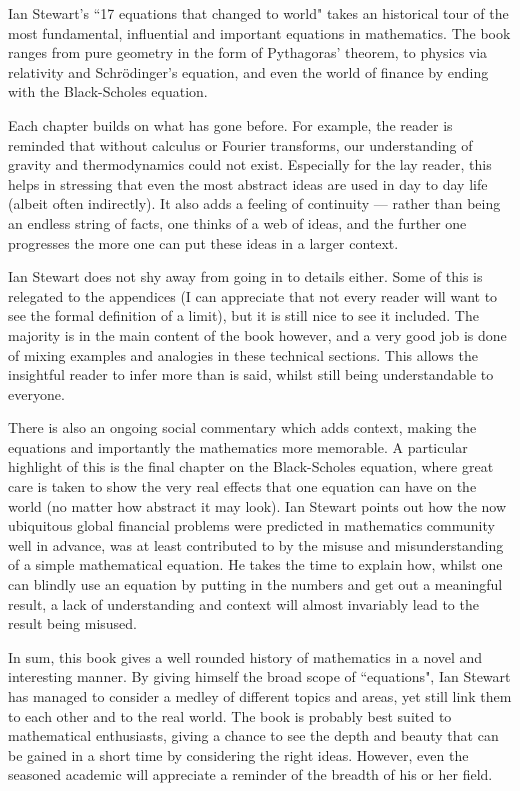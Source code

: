 \documentclass[article,11pt]{memoir}
\begin{document}
Ian Stewart's ``17 equations that changed to world" takes an historical tour of the most fundamental, influential and important equations in mathematics. The book ranges from pure geometry in the form of Pythagoras' theorem, to physics via relativity and Schr\"odinger's equation, and even the world of finance by ending with the Black-Scholes equation.

Each chapter builds on what has gone before. For example, the reader is reminded that without calculus or Fourier transforms, our understanding of gravity and thermodynamics could not exist. Especially for the lay reader, this helps in stressing that even the most abstract ideas are used in day to day life (albeit often indirectly). It also adds a feeling of continuity --- rather than being an endless string of facts, one thinks of a web of ideas, and the further one progresses the more one can put these ideas in a larger context.

Ian Stewart does not shy away from going in to details either. Some of this is relegated to the appendices (I can appreciate that not every reader will want to see the formal definition of a limit), but it is still nice to see it included. The majority is in the main content of the book however, and a very good job is done of mixing examples and analogies in these technical sections. This allows the insightful reader to infer more than is said, whilst still being understandable to everyone.

There is also an ongoing social commentary which adds context, making the equations and importantly the mathematics more memorable. A particular highlight of this is the final chapter on the Black-Scholes equation, where great care is taken to show the very real effects that one equation can have on the world (no matter how abstract it may look). Ian Stewart points out how the now ubiquitous global financial problems were predicted in mathematics community well in advance, was at least contributed to by the misuse and misunderstanding of a simple mathematical equation. He takes the time to explain how, whilst one can blindly use an equation by putting in the numbers and get out a meaningful result, a lack of understanding and context will almost invariably lead to the result being misused. 

In sum, this book gives a well rounded history of mathematics in a novel and interesting manner. By giving himself the broad scope of ``equations", Ian Stewart has managed to consider a medley of different topics and areas, yet still link them to each other and to the real world. The book is probably best suited to mathematical enthusiasts, giving a chance to see the depth and beauty that can be gained in a short time by considering the right ideas. However, even the seasoned academic will appreciate a reminder of the breadth of his or her field.
\end{document}
